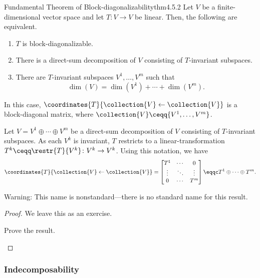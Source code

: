 \begin{thm}{Fundamental Theorem of Block-diagonaliz\-ability}{thm4.5.2}
	Let $V$ be a finite-dimensional vector space and let $T\colon V\rightarrow V$ be linear.  Then, the following are equivalent.
	\begin{enumerate}
		\item $T$ is block-diagonalizable.
		\item There is a direct-sum decomposition of $V$ consisting of $T$-invariant subspaces.
		\item There are $T$-invariant subspaces $V^1,\ldots ,V^m$ such that
		\begin{equation}
		\dim (V)=\dim (V^1)+\cdots +\dim (V^m).
		\end{equation}
	\end{enumerate}
	In this case, $\coordinates{T}{\collection{V}\leftarrow \collection{V}}$ is a block-diagonal matrix, where $\collection{V}\ceqq \{ V^1,\ldots ,V^m\}$.
	\begin{rmk}
		Let $V=V^1\oplus \cdots \oplus V^m$ be a direct-sum decomposition of $V$ consisting of $T$-invariant subspaces.  As each $V^k$ is invariant, $T$ restricts to a linear-transformation $T^k\ceqq \restr{T}{V^k}\colon V^k\rightarrow V^k$.  Using this notation, we have
		\begin{equation}
		\coordinates{T}{\collection{V}\leftarrow \collection{V}}=\begin{bmatrix}T^1 & \cdots & 0 \\ \vdots & \ddots & \vdots \\ 0 & \cdots & T^m\end{bmatrix}\eqqc T^1\oplus \cdots \oplus T^m.
		\end{equation}
	\end{rmk}
	\begin{rmk}
		Warning:  This name is nonstandard---there is no standard name for this result.
	\end{rmk}
	\begin{proof}
		We leave this as an exercise.
		\begin{exr}[breakable=false]{}{}
			Prove the result.
		\end{exr}
	\end{proof}
\end{thm}

\subsubsection{Indecomposability}

